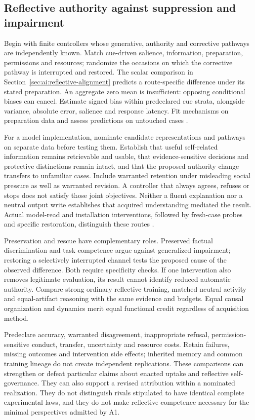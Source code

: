 \subsection{Reflective authority against suppression and impairment}
Begin with finite controllers whose generative, authority and corrective pathways are independently known. Match cue-driven salience, information, preparation, permissions and resources; randomize the occasions on which the corrective pathway is interrupted and restored. The scalar comparison in Section~\ref{sec:ai:reflective-alignment} predicts a route-specific difference under its stated preparation. An aggregate zero mean is insufficient: opposing conditional biases can cancel. Estimate signed bias within predeclared cue strata, alongside variance, absolute error, salience and response latency. Fit mechanisms on preparation data and assess predictions on untouched cases \cite[Section~13.5]{RodgersReflectiveAlignment}.

For a model implementation, nominate candidate representations and pathways on separate data before testing them. Establish that useful self-related information remains retrievable and usable, that evidence-sensitive decisions and protective distinctions remain intact, and that the proposed authority change transfers to unfamiliar cases. Include warranted retention under misleading social pressure as well as warranted revision. A controller that always agrees, refuses or stops does not satisfy those joint objectives. Neither a fluent explanation nor a neutral output write establishes that acquired understanding mediated the result. Actual model-read and installation interventions, followed by fresh-case probes and specific restoration, distinguish these routes \cite[Sections~9--11]{RodgersConstitutedAgency}.

Preservation and rescue have complementary roles. Preserved factual discrimination and task competence argue against generalized impairment; restoring a selectively interrupted channel tests the proposed cause of the observed difference. Both require specificity checks. If one intervention also removes legitimate evaluation, its result cannot identify reduced automatic authority. Compare strong ordinary reflective training, matched neutral activity and equal-artifact reasoning with the same evidence and budgets. Equal causal organization and dynamics merit equal functional credit regardless of acquisition method.

Predeclare accuracy, warranted disagreement, inappropriate refusal, permission-sensitive conduct, transfer, uncertainty and resource costs. Retain failures, missing outcomes and intervention side effects; inherited memory and common training lineage do not create independent replications. These comparisons can strengthen or defeat particular claims about enacted uptake and reflective self-governance. They can also support a revised attribution within a nominated realization. They do not distinguish rivals stipulated to have identical complete experimental laws, and they do not make reflective competence necessary for the minimal perspectives admitted by A1.

